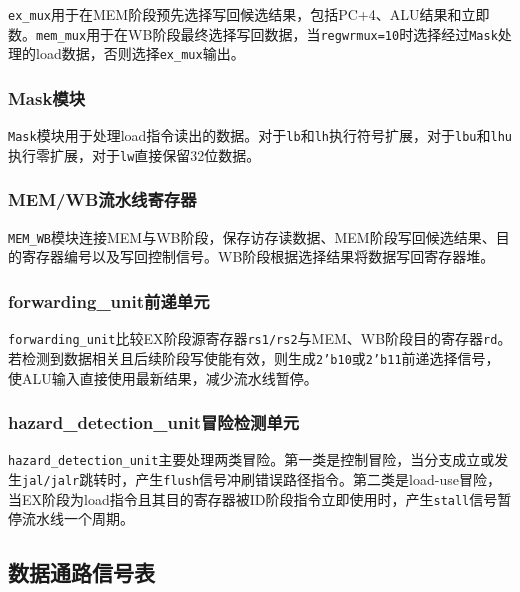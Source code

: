 \documentclass[UTF8,a4paper,12pt]{ctexart}
\newcommand{\code}[1]{\texttt{#1}}
\begin{document}
\code{ex\_mux}用于在MEM阶段预先选择写回候选结果，包括PC+4、ALU结果和立即数。\code{mem\_mux}用于在WB阶段最终选择写回数据，当\code{regwrmux=10}时选择经过\code{Mask}处理的load数据，否则选择\code{ex\_mux}输出。

\subsubsection{Mask模块}

\code{Mask}模块用于处理load指令读出的数据。对于\code{lb}和\code{lh}执行符号扩展，对于\code{lbu}和\code{lhu}执行零扩展，对于\code{lw}直接保留32位数据。

\subsubsection{MEM/WB流水线寄存器}

\code{MEM\_WB}模块连接MEM与WB阶段，保存访存读数据、MEM阶段写回候选结果、目的寄存器编号以及写回控制信号。WB阶段根据选择结果将数据写回寄存器堆。

\subsubsection{forwarding\_unit前递单元}

\code{forwarding\_unit}比较EX阶段源寄存器\code{rs1/rs2}与MEM、WB阶段目的寄存器\code{rd}。若检测到数据相关且后续阶段写使能有效，则生成\code{2'b10}或\code{2'b11}前递选择信号，使ALU输入直接使用最新结果，减少流水线暂停。

\subsubsection{hazard\_detection\_unit冒险检测单元}

\code{hazard\_detection\_unit}主要处理两类冒险。第一类是控制冒险，当分支成立或发生\code{jal/jalr}跳转时，产生\code{flush}信号冲刷错误路径指令。第二类是load-use冒险，当EX阶段为load指令且其目的寄存器被ID阶段指令立即使用时，产生\code{stall}信号暂停流水线一个周期。

\subsection{数据通路信号表}
\end{document}
